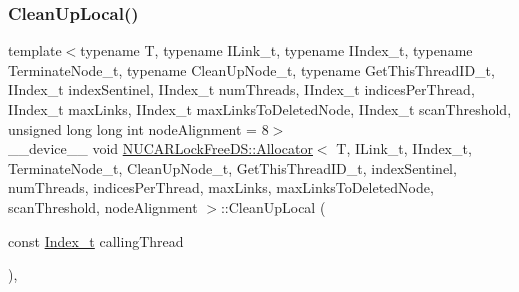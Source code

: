 \subsubsection{\texorpdfstring{Clean\+Up\+Local()}{CleanUpLocal()}}
{\footnotesize\ttfamily template$<$typename T, typename I\+Link\+\_\+t, typename I\+Index\+\_\+t, typename Terminate\+Node\+\_\+t, typename Clean\+Up\+Node\+\_\+t, typename Get\+This\+Thread\+I\+D\+\_\+t, I\+Index\+\_\+t index\+Sentinel, I\+Index\+\_\+t num\+Threads, I\+Index\+\_\+t indices\+Per\+Thread, I\+Index\+\_\+t max\+Links, I\+Index\+\_\+t max\+Links\+To\+Deleted\+Node, I\+Index\+\_\+t scan\+Threshold, unsigned long long int node\+Alignment = 8$>$ \\
\+\_\+\+\_\+device\+\_\+\+\_\+ void \mbox{\hyperlink{class_n_u_c_a_r_lock_free_d_s_1_1_allocator}{N\+U\+C\+A\+R\+Lock\+Free\+D\+S\+::\+Allocator}}$<$ T, I\+Link\+\_\+t, I\+Index\+\_\+t, Terminate\+Node\+\_\+t, Clean\+Up\+Node\+\_\+t, Get\+This\+Thread\+I\+D\+\_\+t, index\+Sentinel, num\+Threads, indices\+Per\+Thread, max\+Links, max\+Links\+To\+Deleted\+Node, scan\+Threshold, node\+Alignment $>$\+::Clean\+Up\+Local (\begin{DoxyParamCaption}\item[{const \mbox{\hyperlink{class_n_u_c_a_r_lock_free_d_s_1_1_allocator_a2776cca35e8343bf5007bd8b6f3a3f8f}{Index\+\_\+t}}}]{calling\+Thread }\end{DoxyParamCaption})\hspace{0.3cm}{\ttfamily [inline]}, {\ttfamily [private]}}

\mbox{\label{class_n_u_c_a_r_lock_free_d_s_1_1_allocator_a44f1e3d3b32739a116a7acccae7b29db}} 

